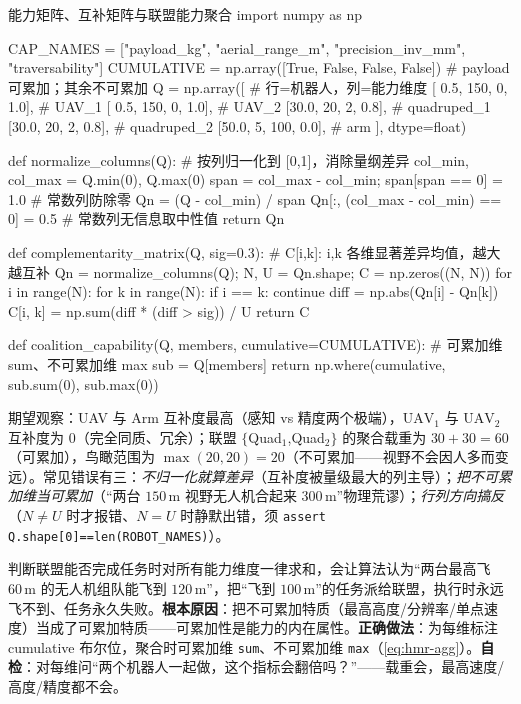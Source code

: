 \begin{codebox}[Python]{能力矩阵、互补矩阵与联盟能力聚合}
import numpy as np

CAP_NAMES  = ["payload_kg", "aerial_range_m", "precision_inv_mm", "traversability"]
CUMULATIVE = np.array([True, False, False, False])   # payload 可累加；其余不可累加
Q = np.array([                                       # 行=机器人，列=能力维度
    [ 0.5, 150,   0, 1.0],   # UAV_1
    [ 0.5, 150,   0, 1.0],   # UAV_2
    [30.0,  20,   2, 0.8],   # quadruped_1
    [30.0,  20,   2, 0.8],   # quadruped_2
    [50.0,   5, 100, 0.0],   # arm
], dtype=float)

def normalize_columns(Q):                            # 按列归一化到 [0,1]，消除量纲差异
    col_min, col_max = Q.min(0), Q.max(0)
    span = col_max - col_min; span[span == 0] = 1.0  # 常数列防除零
    Qn = (Q - col_min) / span
    Qn[:, (col_max - col_min) == 0] = 0.5            # 常数列无信息取中性值
    return Qn

def complementarity_matrix(Q, sig=0.3):              # C[i,k]: i,k 各维显著差异均值，越大越互补
    Qn = normalize_columns(Q); N, U = Qn.shape; C = np.zeros((N, N))
    for i in range(N):
        for k in range(N):
            if i == k: continue
            diff = np.abs(Qn[i] - Qn[k])
            C[i, k] = np.sum(diff * (diff > sig)) / U
    return C

def coalition_capability(Q, members, cumulative=CUMULATIVE):   # 可累加维 sum、不可累加维 max
    sub = Q[members]
    return np.where(cumulative, sub.sum(0), sub.max(0))
\end{codebox}

\noindent 期望观察：UAV 与 Arm 互补度最高（感知 vs 精度两个极端），$\mathrm{UAV}_1$ 与 $\mathrm{UAV}_2$ 互补度为 $0$（完全同质、冗余）；联盟 $\{$Quad$_1$,Quad$_2\}$ 的聚合载重为 $30+30=60$（可累加），鸟瞰范围为 $\max(20,20)=20$（不可累加——视野不会因人多而变远）。常见错误有三：\emph{不归一化就算差异}（互补度被量级最大的列主导）；\emph{把不可累加维当可累加}（“两台 $150\,\mathrm{m}$ 视野无人机合起来 $300\,\mathrm{m}$”物理荒谬）；\emph{行列方向搞反}（$N\ne U$ 时才报错、$N=U$ 时静默出错，须 \texttt{assert Q.shape[0]==len(ROBOT\_NAMES)}）。

\begin{pitfall}
判断联盟能否完成任务时对所有能力维度一律求和，会让算法认为“两台最高飞 $60\,\mathrm{m}$ 的无人机组队能飞到 $120\,\mathrm{m}$”，把“飞到 $100\,\mathrm{m}$”的任务派给联盟，执行时永远飞不到、任务永久失败。\textbf{根本原因}：把不可累加特质（最高高度/分辨率/单点速度）当成了可累加特质——可累加性是能力的内在属性。\textbf{正确做法}：为每维标注 cumulative 布尔位，聚合时可累加维 \texttt{sum}、不可累加维 \texttt{max}（\cref{eq:hmr-agg}）。\textbf{自检}：对每维问“两个机器人一起做，这个指标会翻倍吗？”——载重会，最高速度/高度/精度都不会。
\end{pitfall}

